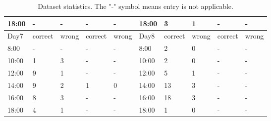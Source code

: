 \begin{table}[]
\begin{tabular}{l|ll|ll|l|ll|ll|}
\multicolumn{1}{|l|}{18:00} & -                   & -                 & -                   & -                 & 18:00 & 3                   & 1                 & -                   & -                 \\ \hline
\multicolumn{1}{|l|}{Day7}  & correct             & wrong             & correct             & wrong             & Day8  & correct             & wrong             & correct             & wrong             \\ \hline
\multicolumn{1}{|l|}{8:00}  & -                   & -                 & -                   & -                 & 8:00  & 2                   & 0                 & -                   & -                 \\
\multicolumn{1}{|l|}{10:00} & 1                   & 3                 & -                   & -                 & 10:00 & 2                   & 0                 & -                   & -                 \\
\multicolumn{1}{|l|}{12:00} & 9                   & 1                 & -                   & -                 & 12:00 & 5                   & 1                 & -                   & -                 \\
\multicolumn{1}{|l|}{14:00} & 9                   & 2                 & 1                   & 0                 & 14:00 & 13                  & 3                 & -                   & -                 \\
\multicolumn{1}{|l|}{16:00} & 8                   & 3                 & -                   & -                 & 16:00 & 18                  & 3                 & -                   & -                 \\
\multicolumn{1}{|l|}{18:00} & 4                   & 1                 & -                   & -                 & 18:00 & 1                   & 0                 & -                   & -                 \\ \hline
\end{tabular}
\caption{Dataset statistics. The "-" symbol means entry is not applicable.}\label{tab:eva_data}
\end{table}

